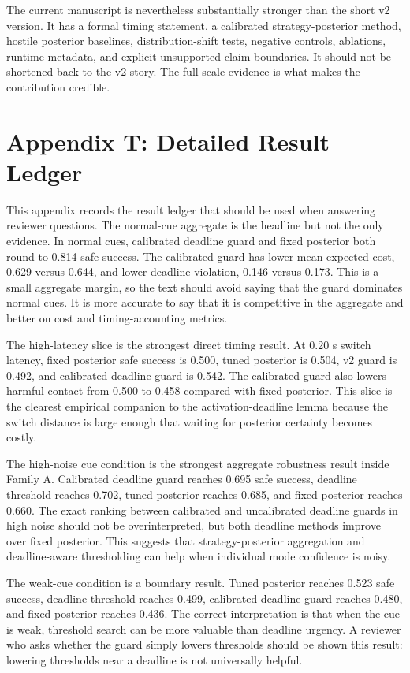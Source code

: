 \documentclass{article}
\begin{document}
The current manuscript is nevertheless substantially stronger than the short v2 version. It has a formal timing statement, a calibrated strategy-posterior method, hostile posterior baselines, distribution-shift tests, negative controls, ablations, runtime metadata, and explicit unsupported-claim boundaries. It should not be shortened back to the v2 story. The full-scale evidence is what makes the contribution credible.

\section{Appendix T: Detailed Result Ledger}

This appendix records the result ledger that should be used when answering reviewer questions. The normal-cue aggregate is the headline but not the only evidence. In normal cues, calibrated deadline guard and fixed posterior both round to 0.814 safe success. The calibrated guard has lower mean expected cost, 0.629 versus 0.644, and lower deadline violation, 0.146 versus 0.173. This is a small aggregate margin, so the text should avoid saying that the guard dominates normal cues. It is more accurate to say that it is competitive in the aggregate and better on cost and timing-accounting metrics.

The high-latency slice is the strongest direct timing result. At 0.20 s switch latency, fixed posterior safe success is 0.500, tuned posterior is 0.504, v2 guard is 0.492, and calibrated deadline guard is 0.542. The calibrated guard also lowers harmful contact from 0.500 to 0.458 compared with fixed posterior. This slice is the clearest empirical companion to the activation-deadline lemma because the switch distance is large enough that waiting for posterior certainty becomes costly.

The high-noise cue condition is the strongest aggregate robustness result inside Family A. Calibrated deadline guard reaches 0.695 safe success, deadline threshold reaches 0.702, tuned posterior reaches 0.685, and fixed posterior reaches 0.660. The exact ranking between calibrated and uncalibrated deadline guards in high noise should not be overinterpreted, but both deadline methods improve over fixed posterior. This suggests that strategy-posterior aggregation and deadline-aware thresholding can help when individual mode confidence is noisy.

The weak-cue condition is a boundary result. Tuned posterior reaches 0.523 safe success, deadline threshold reaches 0.499, calibrated deadline guard reaches 0.480, and fixed posterior reaches 0.436. The correct interpretation is that when the cue is weak, threshold search can be more valuable than deadline urgency. A reviewer who asks whether the guard simply lowers thresholds should be shown this result: lowering thresholds near a deadline is not universally helpful.
\end{document}
